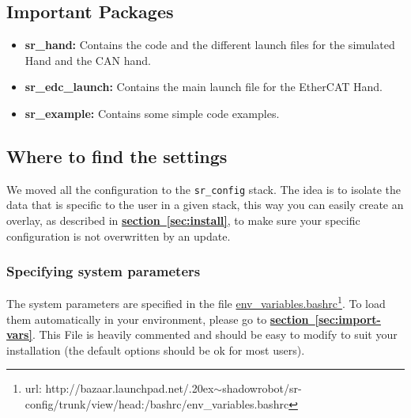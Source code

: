 \documentclass[12pt]{article}
\newcommand{\linuxtilde}{\raise.20ex\hbox{$\scriptstyle\mathtt{\sim}$}}
\newcommand{\link}[1]{\hyperref[sec:#1]{\textbf{section~\ref*{sec:#1}}}}
\begin{document}
\subsection{Important Packages}
\label{sec:important-packages}
\begin{itemize}
\item \textbf{sr\_hand:} Contains the code and the different launch files for the simulated Hand and the CAN hand.
\item \textbf{sr\_edc\_launch:} Contains the main launch file for the EtherCAT Hand.
\item \textbf{sr\_example:} Contains some simple code examples.
\end{itemize}


\subsection{Where to find the settings}
\label{sec:where-find-settings}
\par We moved all the configuration to the \texttt{sr\_config} stack. The idea is to isolate the data that is specific to the user in a given stack, this way you can easily create an overlay, as described in \link{install}, to make sure your specific configuration is not overwritten by an update.

\subsubsection{Specifying system parameters}
\label{sec:spec-system-param}
\par The system parameters are specified in the file
\href{http://bazaar.launchpad.net/~shadowrobot/sr-config/trunk/view/head:/bashrc/env_variables.bashrc}{env\_variables.bashrc}\footnote{url: http://bazaar.launchpad.net/\linuxtilde shadowrobot/sr-config/trunk/view/head:/bashrc/env\_variables.bashrc}. To load them automatically in your environment, please go to \link{import-vars}. This File is heavily commented and should be easy to modify to suit your installation (the default options should be ok for most users).
\end{document}
